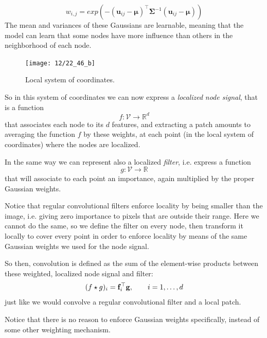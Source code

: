 \begin{equation}
	w_{i, j} = exp\left( - \left( \mathbf{u}_{ij} - \mathbf{\mu} \right)^\top \mathbf{\Sigma}^{-1} \left( \mathbf{u}_{ij} - \mathbf{\mu} \right) \right)
\end{equation}
The mean and variances of these Gaussians are learnable, meaning that the model can learn that some nodes have more influence than others in the neighborhood of each node.

\begin{figure}[H]
	\centering
	\texttt{[image: 12/22\_46\_b]}
	\caption{Local system of coordinates.}\label{fig:local-coord-weights}	
\end{figure}

So in this system of coordinates we can now express a \emph{localized} \emph{node signal}, that is a function
\begin{equation}
    f: \mathcal{V} \to \mathbb{R}^d
\end{equation}
that associates each node to its $d$ features, and extracting a patch amounts to averaging the function $f$ by these weights, at each point (in the local system of coordinates) where the nodes are localized.

In the same way we can represent also a localized \emph{filter}, i.e. express a function
\begin{equation}
    g: \mathcal{V} \to \mathbb{R}
\end{equation}
that will associate to each point an importance, again multiplied by the proper Gaussian weights. 

Notice that regular convolutional filters enforce locality by being smaller than the image, i.e. giving zero importance to pixels that are outside their range. Here we cannot do the same, so we define the filter on every node, then transform it locally to cover every point in order to enforce locality by means of the same Gaussian weights we used for the node signal.

So then, convolution is defined as the sum of the element-wise products between these weighted, localized node signal and filter:
\begin{equation}
    (f \star g)_i = \vb{f}_i^{\top} \vb{g}, \qquad i = 1, \dots, d
\end{equation}
just like we would convolve a regular convolutional filter and a local patch.

Notice that there is no reason to enforce Gaussian weights specifically, instead of some other weighting mechanism.

